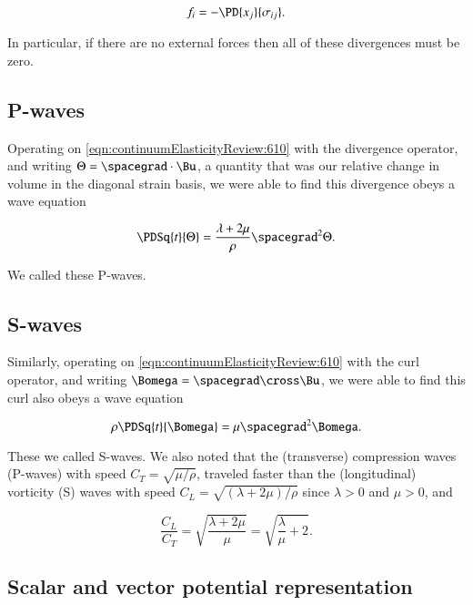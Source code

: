 \begin{equation}\label{eqn:continuumFluidsReviewXX:1090b}
f_i = - \PD{x_j}{\sigma_{ij}}.
\end{equation}

In particular, if there are no external forces then all of these divergences must be zero.  

\subsection{P-waves}

Operating on \ref{eqn:continuumElasticityReview:610} with the divergence operator, and writing $\Theta = \spacegrad \cdot \Bu$, a quantity that was our relative change in volume in the diagonal strain basis, we were able to find this divergence obeys a wave equation

\begin{equation}\label{eqn:continuumElasticityReview:630}
\PDSq{t}{\Theta} = \frac{\lambda + 2 \mu}{\rho} \spacegrad^2 \Theta.
\end{equation}

We called these P-waves.

\subsection{S-waves}

Similarly, operating on \ref{eqn:continuumElasticityReview:610} with the curl operator, and writing $\Bomega = \spacegrad \cross \Bu$, we were able to find this curl also obeys a wave equation

\begin{equation}\label{eqn:continuumElasticityReview:650}
\rho \PDSq{t}{\Bomega} = \mu \spacegrad^2 \Bomega.
\end{equation}

These we called S-waves.  We also noted that the (transverse) compression waves (P-waves) with speed $C_T = \sqrt{\mu/\rho}$, traveled faster than the (longitudinal) vorticity (S) waves with speed $C_L = \sqrt{(\lambda + 2 \mu)/\rho}$ since $\lambda > 0$ and $\mu > 0$, and 

\begin{equation}\label{eqn:continuumElasticityReview:670}
\frac{C_L}{C_T} = \sqrt{\frac{ \lambda + 2 \mu}{\mu}} = \sqrt{ \frac{\lambda}{\mu} + 2}.
\end{equation}

\subsection{Scalar and vector potential representation}

